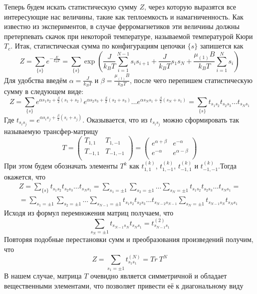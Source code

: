 \documentclass[oneside,final,14pt]{extarticle}
\begin{document}
	Теперь будем искать статистическую сумму $Z$, через которую выразятся все интересующие нас величины, такие как теплоемкость и намагниченность. Как известно из экспериментов, в случае ферромагнетиков эти величины должны претерпевать скачок при некоторой температуре, называемой температурой Кюри $T_{c}$. Итак, статистическая сумма по конфигурациям цепочки $\{s\}$ запишется как
	$$Z=\sum_{\{s\}}e^{-\frac{E}{k_{B}T}}=\sum_{\{s\}}\exp\left(\frac{J}{k_{B}T}\sum_{i=1}^{N-1}s_{i}s_{i+1}+\frac{J}{k_{B}T}s_{1}s_{N}+\frac{\mu_{(1)}B}{k_{B}T}\sum_{i=1}^{N}s_{i}\right)$$
	Для удобства введём $\alpha=\frac{J}{k_{B}T}$ и $\beta=\frac{\mu_{(1)}B}{k_{B}T}$, после чего перепишем статистическую сумму в следующем виде:
	$$Z=\sum_{\{s\}}e^{\alpha s_{1}s_{2}+\frac{\beta}{2}(s_{1}+s_{2})}e^{\alpha s_{2}s_{3}+\frac{\beta}{2}(s_{2}+s_{3})}\ldots e^{\alpha s_{N}s_{1}+\frac{\beta}{2}(s_{N}+s_{1})}=\sum_{\{s\}}t_{s_{1}s_{2}}t_{s_{2}s_{3}}\ldots t_{s_{N}s_{1}}$$
	Где $t_{s_{i}s_{j}}=e^{\alpha s_{i}s_{j}+\frac{\beta}{2}(s_{i}+s_{j})}$. Оказывается, что из $t_{s_{i}s_{j}}$ можно сформировать так называемую трансфер-матрицу 
	$$T=
	\begin{pmatrix}
		T_{1, 1} & T_{1, -1} \\
		T_{-1, 1} & T_{-1, -1} \\
	\end{pmatrix}=
	\begin{pmatrix}
		e^{\alpha+\beta} & e^{-\alpha} \\
		e^{-\alpha} & e^{\alpha-\beta} \\
	\end{pmatrix}$$
	При этом будем обозначать элементы $T^{k}$ как $t^{(k)}_{1, 1}$, $t^{(k)}_{1, -1}$, $t^{(k)}_{-1, 1}$ и $t^{(k)}_{-1, -1}$.Тогда окажется, что 
	\begin{multline*}
		Z=\sum_{\{s\}}t_{s_{1}s_{2}}t_{s_{2}s_{3}}\ldots t_{s_{N}s_{1}}=\sum_{s_{1}=\pm 1}\sum_{s_{2}=\pm 1}\ldots\sum_{s_{N}=\pm 1}t_{s_{1}s_{2}}t_{s_{2}s_{3}}\ldots t_{s_{N}s_{1}}= \\= \sum_{s_{1}=\pm 1}\sum_{s_{2}=\pm 1}\ldots\sum_{s_{N-1}=\pm 1}t_{s_{1}s_{2}}t_{s_{2}s_{3}}\ldots t_{s_{N-2}s_{N-1}}\sum_{s_{N}=\pm 1}t_{s_{N-1}s_{N}}t_{s_{N}s_{1}}
	\end{multline*}
	Исходя из формул перемножения матриц получаем, что 
	$$\sum_{s_{N}=\pm 1}t_{s_{N-1}s_{N}}t_{s_{N}s_{1}}=t^{(2)}_{s_{N-1}s_{1}}$$
	Повторяя подобные перестановки сумм и преобразования произведений получим, что 
	$$Z=\sum_{s_{1}=\pm 1}t^{(N)}_{s_{1}s_{1}}=Tr \ T^{N}$$
	В нашем случае, матрица $T$ очевидно является симметричной и обладает вещественными элементами, что позволяет привести её к диагональному виду 
\end{document}
